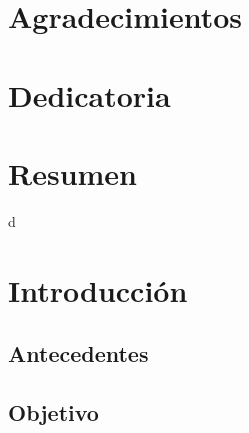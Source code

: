 \documentclass[12pt]{book}
\begin{document}
\mainmatter


\frontmatter

\renewcommand{\contentsname}{Índice}


\chapter*{Agradecimientos}



\newpage

\chapter*{Dedicatoria}






\chapter*{Resumen}



d
\newpage 





\tableofcontents
\mainmatter





\chapter{Introducción}

\newpage


\section{Antecedentes}




\newpage




	



\newpage

\section{Objetivo}
\end{document}
